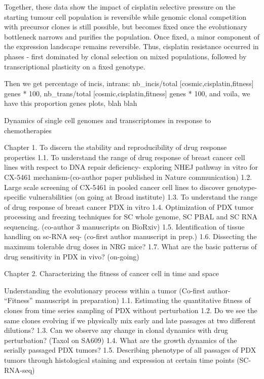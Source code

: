 Together, these data show the impact of cisplatin selective pressure on the starting tumour cell population is reversible while genomic clonal competition with precursor clones is still possible, but becomes fixed once the evolutionary bottleneck narrows and purifies the population. Once fixed, a minor component of the expression landscape remains reversible. Thus, cisplatin resistance occurred in phases - first dominated by clonal selection on mixed populations, followed by transcriptional plasticity on a fixed genotype.



Then we get percentage of incis, intrans: nb\_incis/total [cosmic,cisplatin,fitness] genes * 100,  nb\_trans/total [cosmic,cisplatin,fitness] genes * 100, and voila, we have this proportion genes plots, blah blah












Dynamics of single cell genomes and transcriptomes in response to chemotherapies

Chapter 1. To discern the stability and reproducibility of drug response properties  
1.1. To understand the range of drug response of breast cancer cell lines with respect to DNA repair deficiency- exploring NHEJ pathway in vitro for CX-5461 mechanism-(co-author paper published in Nature communication)
1.2. Large scale screening of CX-5461 in pooled cancer cell lines to discover genotype-specific vulnerabilities (on going at Broad institute)
1.3. To understand the range of drug response of breast cancer PDX in vitro
1.4. Optimization of PDX tumor processing and freezing techniques for SC whole genome, SC PBAL and SC RNA sequencing. (co-author 3 manuscripts on BioRxiv) 
1.5. Identification of tissue handling on sc-RNA seq- (co-first author manuscript in prep.)
1.6. Dissecting the maximum tolerable drug doses in NRG mice?
1.7. What are the basic patterns of drug sensitivity in PDX in vivo? (on-going)

Chapter 2. Characterizing the fitness of cancer cell in time and space

Understanding the evolutionary process within a tumor (Co-first author- “Fitness” manuscript in preparation)
1.1. Estimating the quantitative fitness of clones from time series sampling of PDX without perturbation
1.2. Do we see the same clones evolving if we physically mix early and late passages at two different dilutions?
1.3. Can we observe any change in clonal dynamics with drug perturbation? (Taxol on SA609)
1.4. What are the growth dynamics of the serially passaged PDX tumors?
1.5. Describing phenotype of all passages of PDX tumors through histological staining and expression at certain time points (SC-RNA-seq) 

